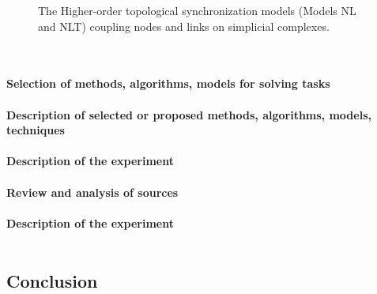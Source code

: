 \documentclass[draft]{article}
\begin{document}
\begin{figure}[h]
\caption{The Higher-order topological synchronization models (Models NL and NLT) coupling nodes and links on simplicial complexes\cite{litlink6}.}
\label{ris:image}
\end{figure}\\
~\\
\textbf{Selection of methods, algorithms, models for solving tasks}\\
~\\
\textbf{Description of selected or proposed methods, algorithms, models, techniques}\\
~\\
\textbf{Description of the experiment}\\
~\\
\textbf{Review and analysis of sources}\\
~\\
\textbf{Description of the experiment}\\
~\\

\newpage
\begin{center}
\section {Conclusion}
\end{center}
\end{document}
